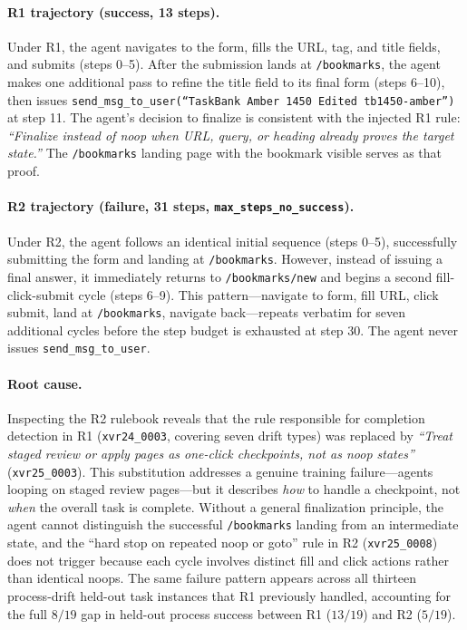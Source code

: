 \paragraph{R1 trajectory (success, 13 steps).}
Under R1, the agent navigates to the form, fills the URL, tag, and title fields, and submits (steps 0--5). After the submission lands at \texttt{/bookmarks}, the agent makes one additional pass to refine the title field to its final form (steps 6--10), then issues \texttt{send\_msg\_to\_user(``TaskBank Amber 1450 Edited tb1450-amber'')} at step 11. The agent's decision to finalize is consistent with the injected R1 rule: \emph{``Finalize instead of noop when URL, query, or heading already proves the target state.''} The \texttt{/bookmarks} landing page with the bookmark visible serves as that proof.

\paragraph{R2 trajectory (failure, 31 steps, \texttt{max\_steps\_no\_success}).}
Under R2, the agent follows an identical initial sequence (steps 0--5), successfully submitting the form and landing at \texttt{/bookmarks}. However, instead of issuing a final answer, it immediately returns to \texttt{/bookmarks/new} and begins a second fill-click-submit cycle (steps 6--9). This pattern---navigate to form, fill URL, click submit, land at \texttt{/bookmarks}, navigate back---repeats verbatim for seven additional cycles before the step budget is exhausted at step 30. The agent never issues \texttt{send\_msg\_to\_user}.

\paragraph{Root cause.}
Inspecting the R2 rulebook reveals that the rule responsible for completion detection in R1 (\texttt{xvr24\_0003}, covering seven drift types) was replaced by \emph{``Treat staged review or apply pages as one-click checkpoints, not as noop states''} (\texttt{xvr25\_0003}). This substitution addresses a genuine training failure---agents looping on staged review pages---but it describes \emph{how} to handle a checkpoint, not \emph{when} the overall task is complete. Without a general finalization principle, the agent cannot distinguish the successful \texttt{/bookmarks} landing from an intermediate state, and the ``hard stop on repeated noop or goto'' rule in R2 (\texttt{xvr25\_0008}) does not trigger because each cycle involves distinct fill and click actions rather than identical noops. The same failure pattern appears across all thirteen process-drift held-out task instances that R1 previously handled, accounting for the full \(8/19\) gap in held-out process success between R1 (\(13/19\)) and R2 (\(5/19\)).

